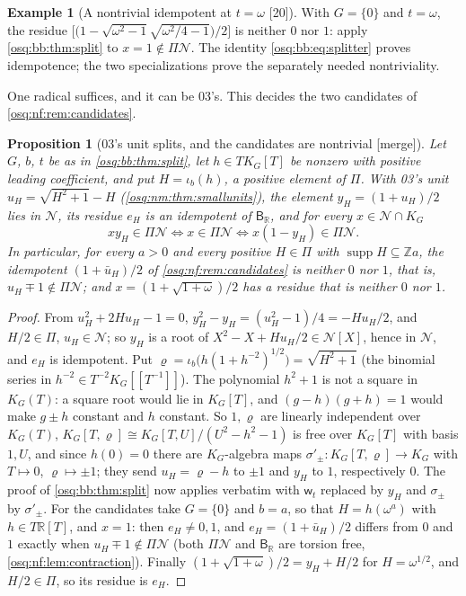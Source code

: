 \documentclass[11pt,letterpaper]{article}
\numberwithin{equation}{section}
\newtheorem{proposition}[proposition]{Proposition}
\theoremstyle{definition}
\newtheorem{example}[example]{Example}
\theoremstyle{remark}
\theoremstyle{plain}
\newcommand{\Z}{\mathbb Z}
\newcommand{\R}{\mathbb R}
\newcommand{\NN}{\mathcal N}         %
\newcommand{\supp}{\operatorname{supp}}
\newcommand{\src}[1]{\textup{\textsf{[#1]}}}
\newcommand{\merge}{\textup{\textsf{[merge]}}}
\begin{document}
\begin{example}[A nontrivial idempotent at $t=\omega$ \src{20}]\label{osq:bb:ex:omega}
With $G=\{0\}$ and $t=\omega$, the residue $\bigl[\bigl(1-\sqrt{\omega^2-1}\sqrt{\omega^2/4-1}\bigr)/2\bigr]$ is neither $0$ nor $1$:
apply \cref{osq:bb:thm:split} to $x=1\notin\Pi\NN$. The identity \eqref{osq:bb:eq:splitter} proves idempotence; the two
specializations prove the separately needed nontriviality.
\end{example}

One radical suffices, and it can be 03's. This decides the two candidates of \cref{osq:nf:rem:candidates}.

\begin{proposition}[03's unit splits, and the candidates are nontrivial \merge]\label{osq:bb:prop:candidates}
Let $G$, $b$, $t$ be as in \cref{osq:bb:thm:split}, let $h\in TK_G[T]$ be nonzero with positive leading coefficient, and put
$H=\iota_b(h)$, a positive element of $\Pi$. With 03's unit $u_H=\sqrt{H^2+1}-H$ (\cref{osq:nm:thm:smallunits}), the element
$y_H=(1+u_H)/2$ lies in $\NN$, its residue $e_H$ is an idempotent of $\mathsf B_\R$, and for every $x\in\NN\cap K_G$
\[
 xy_H\in\Pi\NN\iff x\in\Pi\NN\iff x(1-y_H)\in\Pi\NN .
\]
In particular, for every $a>0$ and every positive $H\in\Pi$ with $\supp H\subseteq\Z a$, the idempotent $(1+\bar u_H)/2$ of
\cref{osq:nf:rem:candidates} is neither $0$ nor $1$, that is, $u_H\mp1\notin\Pi\NN$; and $x=(1+\sqrt{1+\omega})/2$ has a residue that
is neither $0$ nor $1$.
\end{proposition}
\begin{proof}
From $u_H^2+2Hu_H-1=0$, $y_H^2-y_H=(u_H^2-1)/4=-Hu_H/2$, and $H/2\in\Pi$, $u_H\in\NN$; so $y_H$ is a root of
$X^2-X+Hu_H/2\in\NN[X]$, hence in $\NN$, and $e_H$ is idempotent. Put $\varrho=\iota_b\bigl(h(1+h^{-2})^{1/2}\bigr)=\sqrt{H^2+1}$ (the
binomial series in $h^{-2}\in T^{-2}K_G[[T^{-1}]]$). The polynomial $h^2+1$ is not a square in $K_G(T)$: a square root would lie in
$K_G[T]$, and $(g-h)(g+h)=1$ would make $g\pm h$ constant and $h$ constant. So $1,\varrho$ are linearly independent over $K_G(T)$,
$K_G[T,\varrho]\cong K_G[T,U]/(U^2-h^2-1)$ is free over $K_G[T]$ with basis $1,U$, and since $h(0)=0$ there are $K_G$-algebra maps
$\sigma'_\pm:K_G[T,\varrho]\to K_G$ with $T\mapsto0$, $\varrho\mapsto\pm1$; they send $u_H=\varrho-h$ to $\pm1$ and $y_H$ to $1$, respectively
$0$. The proof of \cref{osq:bb:thm:split} now applies verbatim with $\mathsf w_t$ replaced by $y_H$ and $\sigma_\pm$ by $\sigma'_\pm$.
For the candidates take $G=\{0\}$ and $b=a$, so that $H=h(\omega^a)$ with $h\in T\R[T]$, and $x=1$: then $e_H\ne0,1$, and
$e_H=(1+\bar u_H)/2$ differs from $0$ and $1$ exactly when $u_H\mp1\notin\Pi\NN$ (both $\Pi\NN$ and $\mathsf B_\R$ are torsion free,
\cref{osq:nf:lem:contraction}). Finally $(1+\sqrt{1+\omega})/2=y_H+H/2$ for $H=\omega^{1/2}$, and $H/2\in\Pi$, so its residue is $e_H$.
\end{proof}
\end{document}
